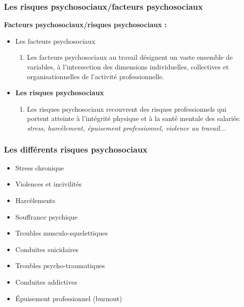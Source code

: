 \documentclass{beamer}
\begin{document}
\begin{frame}
\frametitle{Les risques psychosociaux/facteurs psychosociaux}

\textbf{Facteurs psychosociaux/risques psychosociaux :}
\begin{itemize}
\item Les facteurs psychosociaux
\begin{enumerate}
	\item Les facteurs psychosociaux au travail désignent un vaste ensemble de variables, à l'intersection des dimensions individuelles, collectives et organisationnelles de l'activité professionnelle.
\end{enumerate}
\item \textbf{Les risques psychosociaux}

\begin{enumerate}
	\item Les risques psychosociaux recouvrent des risques professionnels qui portent atteinte à l’intégrité physique et à la santé mentale des salariés: \textit{stress, harcèlement, épuisement professionnel, violence au travail...}
\end{enumerate}
\end{itemize}
\end{frame}

\begin{frame}
\frametitle{Les différents risques psychosociaux}
\begin{itemize}
\item Stress chronique

\item Violences et incivilités

\item Harcèlements

\item Souffrance psychique

\item Troubles musculo-squelettiques

\item Conduites suicidaires

\item Troubles psycho-traumatiques

\item Conduites addictives

\item Épuisement professionnel (burnout)
\end{itemize}
\end{frame}
\end{document}
